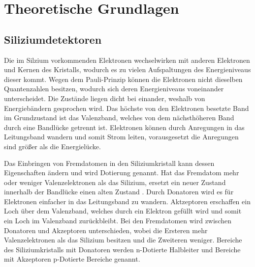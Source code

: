 \chapter{Theoretische Grundlagen}


\section{Siliziumdetektoren}

Die im Silzium vorkommenden Elektronen wechselwirken mit anderen Elektronen und
Kernen des Kristalls, wodurch es zu vielen Aufspaltungen des Energieniveaus dieser kommt. Wegen dem Pauli-Prinzip können
die Elektronen nicht dieselben Quantenzahlen besitzen, wodurch sich deren Energieniveaus voneinander unterscheidet.
Die Zustände liegen dicht bei einander, weshalb von Energiebändern gesprochen wird.
Das höchste von den Elektronen besetzte Band im Grundzustand ist das Valenzband, welches von dem
nächsthöheren Band durch eine Bandlücke getrennt ist. Elektronen können
durch Anregungen in das Leitungsband wandern und somit Strom leiten, vorausgesetzt
die Anregungen sind größer als die Energielücke.

Das Einbringen von Fremdatomen in den Siliziumkristall kann dessen Eigenschaften ändern
und wird Dotierung genannt.
Hat das Fremdatom mehr oder weniger Valenzelektronen als das Silizium, ersetzt ein neuer Zustand innerhalb der Bandlücke
einen alten Zustand .
Durch Donatoren wird es für Elektronen einfacher in das Leitungsband zu wandern. Aktzeptoren
erschaffen ein Loch über dem Valenzband, welches durch ein Elektron gefüllt wird und somit ein
Loch im Valenzband zurückbleibt.
Bei den Fremdatomen wird zwischen Donatoren und Akzeptoren unterschieden, wobei die
Ersteren mehr Valenzelektronen als das Silizium besitzen und die Zweiteren weniger.
Bereiche des Siliziumkristalls mit Donatoren werden n-Dotierte Halbleiter
und Bereiche mit Akzeptoren p-Dotierte Bereiche genannt.

